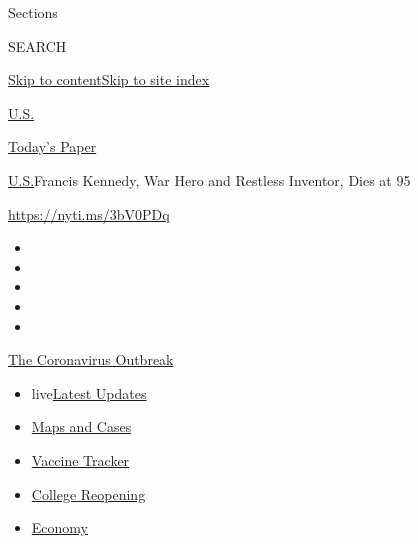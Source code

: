 Sections

SEARCH

\protect\hyperlink{site-content}{Skip to
content}\protect\hyperlink{site-index}{Skip to site index}

\href{https://www.nytimes.com/section/us}{U.S.}

\href{https://myaccount.nytimes.com/auth/login?response_type=cookie\&client_id=vi}{}

\href{https://www.nytimes.com/section/todayspaper}{Today's Paper}

\href{/section/us}{U.S.}\textbar{}Francis Kennedy, War Hero and Restless
Inventor, Dies at 95

\url{https://nyti.ms/3bV0PDq}

\begin{itemize}
\item
\item
\item
\item
\item
\end{itemize}

\href{https://www.nytimes.com/news-event/coronavirus?action=click\&pgtype=Article\&state=default\&region=TOP_BANNER\&context=storylines_menu}{The
Coronavirus Outbreak}

\begin{itemize}
\tightlist
\item
  live\href{https://www.nytimes.com/2020/08/03/world/coronavirus-covid-19.html?action=click\&pgtype=Article\&state=default\&region=TOP_BANNER\&context=storylines_menu}{Latest
  Updates}
\item
  \href{https://www.nytimes.com/interactive/2020/us/coronavirus-us-cases.html?action=click\&pgtype=Article\&state=default\&region=TOP_BANNER\&context=storylines_menu}{Maps
  and Cases}
\item
  \href{https://www.nytimes.com/interactive/2020/science/coronavirus-vaccine-tracker.html?action=click\&pgtype=Article\&state=default\&region=TOP_BANNER\&context=storylines_menu}{Vaccine
  Tracker}
\item
  \href{https://www.nytimes.com/2020/08/02/us/covid-college-reopening.html?action=click\&pgtype=Article\&state=default\&region=TOP_BANNER\&context=storylines_menu}{College
  Reopening}
\item
  \href{https://www.nytimes.com/live/2020/08/03/business/stock-market-today-coronavirus?action=click\&pgtype=Article\&state=default\&region=TOP_BANNER\&context=storylines_menu}{Economy}
\end{itemize}

